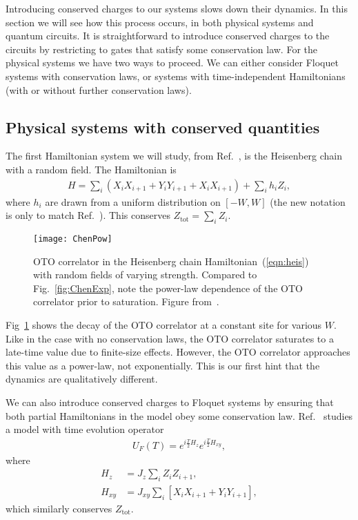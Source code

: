\documentclass[a4paper,11pt]{article}
\newcommand{\tot}{\text{tot}}
\newcommand{\nn}{\nonumber\\}
\begin{document}
Introducing conserved charges to our systems slows down their dynamics. In this section we will see how this process occurs, in both physical systems and quantum circuits. It is straightforward to introduce conserved charges to the circuits by restricting to gates that satisfy some conservation law. For the physical systems we have two ways to proceed. We can either consider Floquet systems with conservation laws, or systems with time-independent Hamiltonians (with or without further conservation laws).

\subsection{Physical systems with conserved quantities} \label{sub:fcons}

The first Hamiltonian system we will study, from Ref.~\cite{ChenOtoc}, is the Heisenberg chain with a random field. The Hamiltonian is
\begin{align}
H = \sum_i\left(X_iX_{i+1} + Y_iY_{i+1} + X_iX_{i+1}\right)+\sum_i h_iZ_i,
	\label{eqn:heis}
\end{align}
where ${h_i}$ are drawn from a uniform distribution on $[-W,W]$ (the new notation is only to match Ref.~\cite{ChenOtoc}). This conserves $Z_\tot=\sum_i Z_i$. 
\begin{figure}
	\centering
	\texttt{[image: ChenPow]}
	\caption{OTO correlator in the Heisenberg chain Hamiltonian~(\ref{eqn:heis}) with random fields of varying strength. Compared to Fig.~\ref{fig:ChenExp}, note the power-law dependence of the OTO correlator prior to saturation. Figure from~\cite{ChenOtoc}.}
	\label{fig:ChenPow}
\end{figure}
Fig~\ref{fig:ChenPow} shows the decay of the OTO correlator at a constant site for various $W$. Like in the case with no conservation laws, the OTO correlator saturates to a late-time value due to finite-size effects. However, the OTO correlator approaches this value as a power-law, not exponentially. This is our first hint that the dynamics are qualitatively different.

We can also introduce conserved charges to Floquet systems by ensuring that both partial Hamiltonians in the model obey some conservation law. Ref.~\cite{KhemaniOpSp} studies a model with time evolution operator
\begin{align}
U_F(T)=e^{i\frac{T}{2}H_z}e^{i\frac{T}{2}H_{xy}}, \label{fig:khemFloq}
\end{align}
where
\begin{align}
H_z &= J_z\sum_i Z_iZ_{i+1},\nn
H_{xy} &= J_{xy}\sum_i\left[X_iX_{i+1}+Y_iY_{i+1}\right],
\end{align}
which similarly conserves $Z_\tot$.
\end{document}

